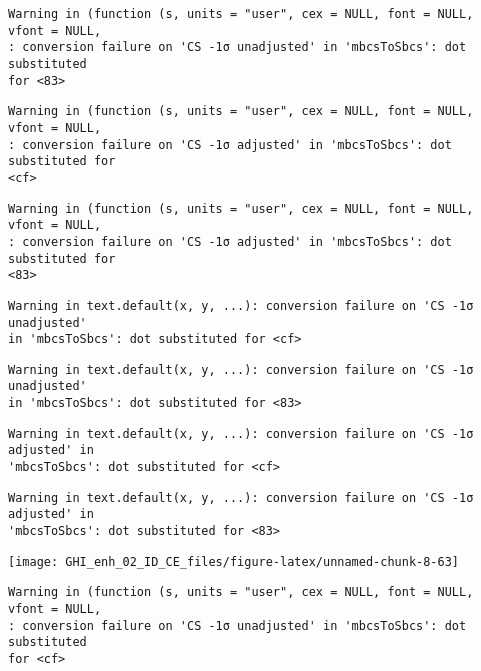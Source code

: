 \documentclass[
  10pt,
  a4paper,oneside]{article}
\begin{document}
\begin{verbatim}
Warning in (function (s, units = "user", cex = NULL, font = NULL, vfont = NULL,
: conversion failure on 'CS -1σ unadjusted' in 'mbcsToSbcs': dot substituted
for <83>
\end{verbatim}

\begin{verbatim}
Warning in (function (s, units = "user", cex = NULL, font = NULL, vfont = NULL,
: conversion failure on 'CS -1σ adjusted' in 'mbcsToSbcs': dot substituted for
<cf>
\end{verbatim}

\begin{verbatim}
Warning in (function (s, units = "user", cex = NULL, font = NULL, vfont = NULL,
: conversion failure on 'CS -1σ adjusted' in 'mbcsToSbcs': dot substituted for
<83>
\end{verbatim}

\begin{verbatim}
Warning in text.default(x, y, ...): conversion failure on 'CS -1σ unadjusted'
in 'mbcsToSbcs': dot substituted for <cf>
\end{verbatim}

\begin{verbatim}
Warning in text.default(x, y, ...): conversion failure on 'CS -1σ unadjusted'
in 'mbcsToSbcs': dot substituted for <83>
\end{verbatim}

\begin{verbatim}
Warning in text.default(x, y, ...): conversion failure on 'CS -1σ adjusted' in
'mbcsToSbcs': dot substituted for <cf>
\end{verbatim}

\begin{verbatim}
Warning in text.default(x, y, ...): conversion failure on 'CS -1σ adjusted' in
'mbcsToSbcs': dot substituted for <83>
\end{verbatim}

\begin{center}\texttt{[image: GHI\_enh\_02\_ID\_CE\_files/figure-latex/unnamed-chunk-8-63]} \end{center}

\begin{verbatim}
Warning in (function (s, units = "user", cex = NULL, font = NULL, vfont = NULL,
: conversion failure on 'CS -1σ unadjusted' in 'mbcsToSbcs': dot substituted
for <cf>
\end{verbatim}
\end{document}
